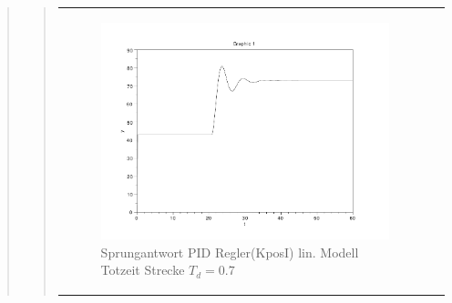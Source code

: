 \begin{quote}
\begin{quote}
\begin{center}
\begin{tabular}{ll}
                    \begin{minipage}{0.6\textwidth}
                        \begin{figure}[H]
                            \includegraphics[scale=0.4,trim = 0cm 0cm 0cm
                            0cm, clip]
                            {./Bilder/4_5_Td_04_KposI}
                              \caption{Sprungantwort PID Regler(KposI) lin. Modell Totzeit Strecke $T_d = 0.7$ }
                        \end{figure}
                    \end{minipage}
                
                \end{tabular}
            \end{center} 
        
        
    \end{quote}
    
    
    
\end{quote}



